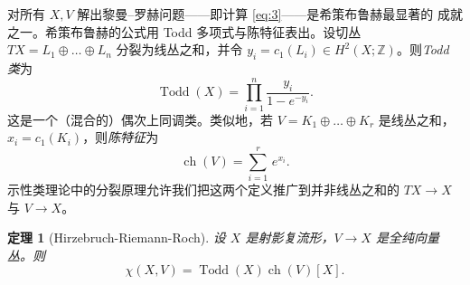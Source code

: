 \documentclass[11pt]{amsart}
\theoremstyle{definition}
\theoremstyle{remark}
\theoremstyle{plain}
\newtheorem{theorem}[equation]{定理}
\numberwithin{equation}{section}
\renewcommand{\:}{\colon}
\newcommand{\Ahat}{{\hat A}}
\newcommand{\ZZ}{{\mathbb Z}}
\DeclareMathOperator{\ch}{ch}
\DeclareMathOperator{\Euler}{Euler}
\DeclareMathOperator{\Sign}{Sign}
\DeclareMathOperator{\Todd}{Todd}
\newcommand{\sO}{\mathcal{O}}
\begin{document}

对所有 $X,V$ 解出黎曼–罗赫问题——即计算 \eqref{eq:3}——是希策布鲁赫最显著的
成就之一。希策布鲁赫的公式用 Todd 多项式与陈特征表出。设切丛
$TX=L_1\oplus \dots \oplus L_n$ 分裂为线丛之和，并令
$y_i = c_1(L_i) \in H^2(X;\ZZ)$。则{\it Todd 类}为
  \begin{equation}\label{eq:5}
     \Todd(X) = \prod_{i=1}^n \frac{y_i}{1-e^{-y_i}}.
  \end{equation}
这是一个（混合的）偶次上同调类。类似地，若 $V=K_1\oplus \dots \oplus K_r$
是线丛之和，$x_i = c_1(K_i)$，则{\it 陈特征}为
  \begin{equation}\label{eq:6}
     \ch(V) = \sum\limits_{i=1}^r \,e^{x_i}.
  \end{equation}
示性类理论中的分裂原理允许我们把这两个定义推广到并非线丛之和的 $TX\to X$
与 $V\to X$。



\begin{theorem}[Hirzebruch-Riemann-Roch]\label{thm:1}
设 $X$ 是射影复流形，$V\to X$ 是全纯向量丛。则
  \begin{equation}\label{eq:7}
     \chi (X,V) = \Todd(X)\ch(V)[X].
  \end{equation}
\end{theorem}
\end{document}
